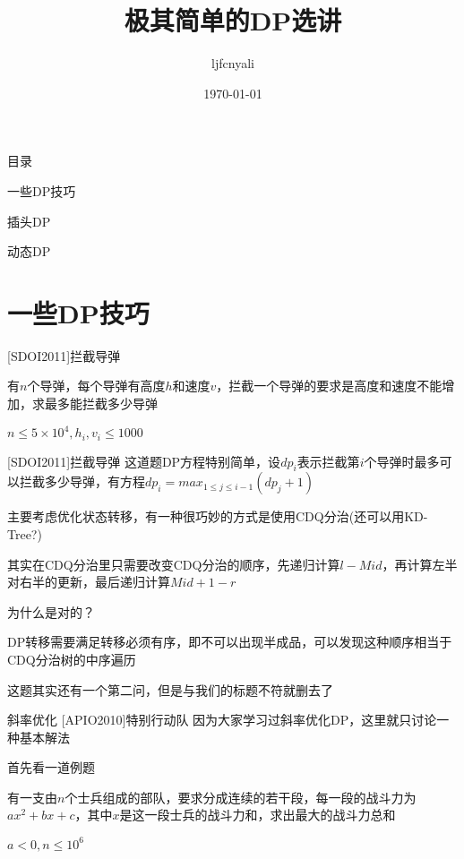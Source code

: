 \documentclass[9pt]{beamer}
\title{极其简单的DP选讲}
\date{\today}
\author{ljfcnyali}
\begin{document}
  \maketitle
  \begin{frame}{目录}
    \par 一些DP技巧
    \par 插头DP
    \par 动态DP
  \end{frame}

  \section{一些DP技巧}
  \begin{frame}{[SDOI2011]拦截导弹}
    \par 有$n$个导弹，每个导弹有高度$h$和速度$v$，拦截一个导弹的要求是高度和速度不能增加，求最多能拦截多少导弹
    \par $n\le 5\times 10^4,h_i,v_i\le 1000$
  \end{frame}
  
  \begin{frame}{[SDOI2011]拦截导弹}
     这道题DP方程特别简单，设$dp_i$表示拦截第$i$个导弹时最多可以拦截多少导弹，有方程$dp_i=max_{1\le j\le i-1}(dp_j+1)$
    
     主要考虑优化状态转移，有一种很巧妙的方式是使用CDQ分治(还可以用KD-Tree?)

     其实在CDQ分治里只需要改变CDQ分治的顺序，先递归计算$l-Mid$，再计算左半对右半的更新，最后递归计算$Mid+1-r$
    
     为什么是对的？

     DP转移需要满足转移必须有序，即不可以出现半成品，可以发现这种顺序相当于CDQ分治树的中序遍历

     这题其实还有一个第二问，但是与我们的标题不符就删去了
  \end{frame}

  \begin{frame}{斜率优化 [APIO2010]特别行动队}
     因为大家学习过斜率优化DP，这里就只讨论一种基本解法

     首先看一道例题

     有一支由$n$个士兵组成的部队，要求分成连续的若干段，每一段的战斗力为$ax^2+bx+c$，其中$x$是这一段士兵的战斗力和，求出最大的战斗力总和
    
     $a<0,n\le 10^6$
  \end{frame}
\end{document}
